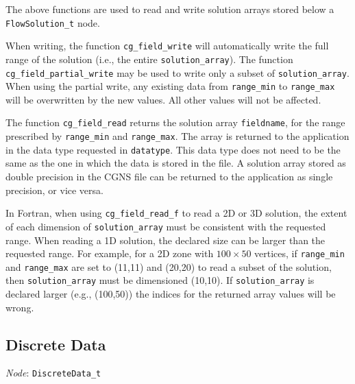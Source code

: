 The above functions are used to read and write solution arrays stored
below a \texttt{FlowSolution\_t} node.

When writing, the function \texttt{cg\_field\_write} will
automatically write the full range of the solution (i.e., the entire
\texttt{solution\_array}).
The function \texttt{cg\_field\_partial\_write} may be used to write
only a subset of \texttt{solution\_array}.
When using the partial write, any existing data from \texttt{range\_min}
to \texttt{range\_max} will be overwritten by the new values.
All other values will not be affected.

The function \texttt{cg\_field\_read} returns the solution array
\texttt{fieldname}, for the range prescribed by \texttt{range\_min} and
\texttt{range\_max}.
The array is returned to the application in the data type requested in
\texttt{datatype}.
This data type does not need to be the same as the one in which the data is
stored in the file.
A solution array stored as double precision in the CGNS file can be
returned to the application as single precision, or vice versa.

In Fortran, when using \texttt{cg\_field\_read\_f} to read a 2D or 3D
solution, the extent of each dimension of \texttt{solution\_array} must
be consistent with the requested range.
When reading a 1D solution, the declared size can be larger than the
requested range.
For example, for a 2D zone with $100 \times 50$ vertices, if
\texttt{range\_min} and \texttt{range\_max} are set to (11,11) and (20,20)
to read a subset of the solution, then \texttt{solution\_array} must be
dimensioned (10,10).
If \texttt{solution\_array} is declared larger (e.g., (100,50)) the
indices for the returned array values will be wrong.

\newpage
\subsection{Discrete Data}
\label{s:discretedata}

\noindent
\textit{Node}: \texttt{DiscreteData\_t}


